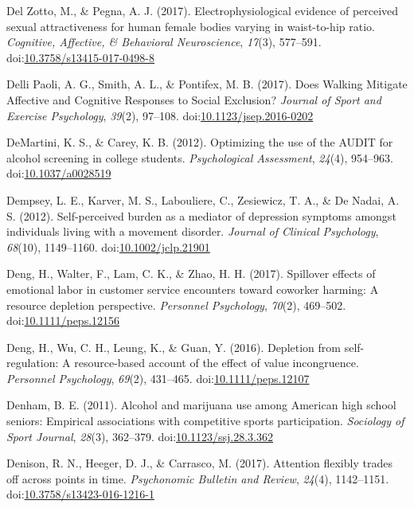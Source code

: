 \documentclass[english,man]{apa6}
\begin{document}
\hypertarget{ref-DelZotto2017}{}
Del Zotto, M., \& Pegna, A. J. (2017). Electrophysiological evidence of
perceived sexual attractiveness for human female bodies varying in
waist-to-hip ratio. \emph{Cognitive, Affective, \& Behavioral
Neuroscience}, \emph{17}(3), 577--591.
doi:\href{https://doi.org/10.3758/s13415-017-0498-8}{10.3758/s13415-017-0498-8}

\hypertarget{ref-Paoli2017}{}
Delli Paoli, A. G., Smith, A. L., \& Pontifex, M. B. (2017). Does
Walking Mitigate Affective and Cognitive Responses to Social Exclusion?
\emph{Journal of Sport and Exercise Psychology}, \emph{39}(2), 97--108.
doi:\href{https://doi.org/10.1123/jsep.2016-0202}{10.1123/jsep.2016-0202}

\hypertarget{ref-DeMartini2012}{}
DeMartini, K. S., \& Carey, K. B. (2012). Optimizing the use of the
AUDIT for alcohol screening in college students. \emph{Psychological
Assessment}, \emph{24}(4), 954--963.
doi:\href{https://doi.org/10.1037/a0028519}{10.1037/a0028519}

\hypertarget{ref-Dempsey2012}{}
Dempsey, L. E., Karver, M. S., Labouliere, C., Zesiewicz, T. A., \& De
Nadai, A. S. (2012). Self-perceived burden as a mediator of depression
symptoms amongst individuals living with a movement disorder.
\emph{Journal of Clinical Psychology}, \emph{68}(10), 1149--1160.
doi:\href{https://doi.org/10.1002/jclp.21901}{10.1002/jclp.21901}

\hypertarget{ref-Deng2017}{}
Deng, H., Walter, F., Lam, C. K., \& Zhao, H. H. (2017). Spillover
effects of emotional labor in customer service encounters toward
coworker harming: A resource depletion perspective. \emph{Personnel
Psychology}, \emph{70}(2), 469--502.
doi:\href{https://doi.org/10.1111/peps.12156}{10.1111/peps.12156}

\hypertarget{ref-Deng2016}{}
Deng, H., Wu, C. H., Leung, K., \& Guan, Y. (2016). Depletion from
self-regulation: A resource-based account of the effect of value
incongruence. \emph{Personnel Psychology}, \emph{69}(2), 431--465.
doi:\href{https://doi.org/10.1111/peps.12107}{10.1111/peps.12107}

\hypertarget{ref-Denham2011}{}
Denham, B. E. (2011). Alcohol and marijuana use among American high
school seniors: Empirical associations with competitive sports
participation. \emph{Sociology of Sport Journal}, \emph{28}(3),
362--379.
doi:\href{https://doi.org/10.1123/ssj.28.3.362}{10.1123/ssj.28.3.362}

\hypertarget{ref-Denison2017}{}
Denison, R. N., Heeger, D. J., \& Carrasco, M. (2017). Attention
flexibly trades off across points in time. \emph{Psychonomic Bulletin
and Review}, \emph{24}(4), 1142--1151.
doi:\href{https://doi.org/10.3758/s13423-016-1216-1}{10.3758/s13423-016-1216-1}
\end{document}
